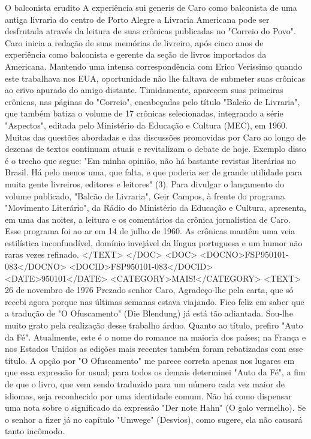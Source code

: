O balconista erudito 
A experiência sui generis de Caro como balconista de uma antiga livraria do centro de Porto Alegre a Livraria Americana pode ser desfrutada através da leitura de suas crônicas publicadas no "Correio do Povo".
Caro inicia a redação de suas memórias de livreiro, após cinco anos de experiência como balconista e gerente da seção de livros importados da Americana. Mantendo uma intensa correspondência com Erico Verissimo quando este trabalhava nos EUA, oportunidade não lhe faltava de submeter suas crônicas ao crivo apurado do amigo distante.
Timidamente, aparecem suas primeiras crônicas, nas páginas do "Correio", encabeçadas pelo título "Balcão de Livraria", que também batiza o volume de 17 crônicas selecionadas, integrando a série "Aspectos", editada pelo Ministério da Educação e Cultura (MEC), em 1960.
Muitas das questões abordadas e das discussões promovidas por Caro ao longo de dezenas de textos continuam atuais e revitalizam o debate de hoje. Exemplo disso é o trecho que segue:
"Em minha opinião, não há bastante revistas literárias no Brasil. Há pelo menos uma, que falta, e que poderia ser de grande utilidade para muita gente livreiros, editores e leitores" (3).
Para divulgar o lançamento do volume publicado, "Balcão de Livraria", Geir Campos, à frente do programa "Movimento Literário", da Rádio do Ministério da Educação e Cultura, apresenta, em uma das noites, a leitura e os comentários da crônica jornalística de Caro. Esse programa foi ao ar em 14 de julho de 1960.
As crônicas mantêm uma veia estilística inconfundível, domínio invejável da língua portuguesa e um humor não raras vezes refinado.
</TEXT>
</DOC>
<DOC>
<DOCNO>FSP950101-083</DOCNO>
<DOCID>FSP950101-083</DOCID>
<DATE>950101</DATE>
<CATEGORY>MAIS!</CATEGORY>
<TEXT>
26 de novembro de 1976
Prezado senhor Caro,
Agradeço-lhe pela carta, que só recebi agora porque nas últimas semanas estava viajando.
Fico feliz em saber que a tradução de "O Ofuscamento" (Die Blendung) já está tão adiantada. Sou-lhe muito grato pela realização desse trabalho árduo.
Quanto ao título, prefiro "Auto da Fé". Atualmente, este é o nome do romance na maioria dos países; na França e nos Estados Unidos as edições mais recentes também foram rebatizadas com esse título. A opção por "O Ofuscamento" me parece correta apenas nos lugares em que essa expressão for usual; para todos os demais determinei "Auto da Fé", a fim de que o livro, que vem sendo traduzido para um número cada vez maior de idiomas, seja reconhecido por uma identidade comum.
Não há como dispensar uma nota sobre o significado da expressão "Der note Hahn" (O galo vermelho). Se o senhor a fizer já no capítulo "Umwege" (Desvios), como sugere, ela não causará tanto incômodo.
